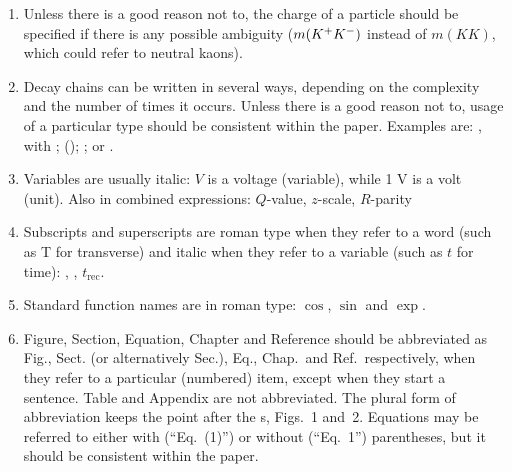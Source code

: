 \begin{enumerate}
  Italic is also used for particles whose name is an uppercase Greek letter:
  \Upsilonres, \Deltares, \Xires, \Lambdares, \Sigmares, \Omegares, typeset as
  \verb!\Upsilonres!, \verb!\Deltares!, \verb!\Xires!, \verb!\Lambdares!, \verb!\Sigmares!, \verb!\Omegares! (or with the appropriate macros adding charge and subscripts). Paper titles in the bibliography must be adapted accordingly.
  Note that the \Lz baryon has no zero, while the \Lb baryon has one. That's historical.
  
\item Unless there is a good reason not to, the charge of a particle should be
  specified if there is any possible ambiguity 
  ($m({{K}^+}{{K}^-})$ instead of $m(KK)$, which could refer to neutral kaons).


\item Decay chains can be written in several ways, depending on the complexity and the number of times it occurs. Unless there is a good reason not to, usage of a particular type should be consistent within the paper.
Examples are: 
\decay{\Dsp}{\phi\pip}, with \decay{\phi}{\Kp\Km}; 
\decay{\Dsp}{\phi\pip} (\decay{\phi}{\Kp\Km});  
\decay{\Dsp}{\phi(}{\Kp\Km)\pip}; or
\decay{\Dsp}{[\Kp\Km]_\phi\pip}.

\item Variables are usually italic: $V$ is a voltage (variable), while
  1 V is a volt (unit). Also in combined expressions: $Q$-value, $z$-scale, $R$-parity \etc

\item Subscripts and superscripts are roman type when they refer to a word (such as T
  for transverse) and italic when they refer to a variable (such as
  $t$ for time): \pt, \dms, $t_{\mathrm{rec}}$.


\item Standard function names are in roman type: \eg $\cos$, $\sin$
  and $\exp$.

\item Figure, Section, Equation, Chapter and Reference should be
  abbreviated as Fig., Sect. (or alternatively Sec.), Eq., Chap.\ and
  Ref.\ respectively, when they refer to a particular (numbered) item,
  except when they start a sentence. Table and Appendix are not
  abbreviated.  The plural form of abbreviation keeps the point after
  the s, \eg Figs.~1 and~2. Equations may be referred to either with 
  (``Eq.~(1)'') or without (``Eq.~1'') parentheses, 
  but it should be consistent within the paper.


\end{enumerate}
